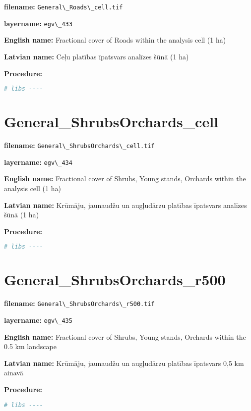 \documentclass[
]{book}
\newcommand{\passthrough}[1]{#1}
\begin{document}
\textbf{filename:} \passthrough{\lstinline!General\_Roads\_cell.tif!}

\textbf{layername:} \passthrough{\lstinline!egv\_433!}

\textbf{English name:} Fractional cover of Roads within the analysis cell (1 ha)

\textbf{Latvian name:} Ceļu platības īpatsvars analīzes šūnā (1 ha)

\textbf{Procedure:}

\begin{lstlisting}[language=R]
# libs ----
\end{lstlisting}

\section{General\_ShrubsOrchards\_cell}\label{ch06.434}

\textbf{filename:} \passthrough{\lstinline!General\_ShrubsOrchards\_cell.tif!}

\textbf{layername:} \passthrough{\lstinline!egv\_434!}

\textbf{English name:} Fractional cover of Shrubs, Young stands, Orchards within the analysis cell (1 ha)

\textbf{Latvian name:} Krūmāju, jaunaudžu un augļudārzu platības īpatsvars analīzes šūnā (1 ha)

\textbf{Procedure:}

\begin{lstlisting}[language=R]
# libs ----
\end{lstlisting}

\section{General\_ShrubsOrchards\_r500}\label{ch06.435}

\textbf{filename:} \passthrough{\lstinline!General\_ShrubsOrchards\_r500.tif!}

\textbf{layername:} \passthrough{\lstinline!egv\_435!}

\textbf{English name:} Fractional cover of Shrubs, Young stands, Orchards within the 0.5 km landscape

\textbf{Latvian name:} Krūmāju, jaunaudžu un augļudārzu platības īpatsvars 0,5 km ainavā

\textbf{Procedure:}

\begin{lstlisting}[language=R]
# libs ----
\end{lstlisting}
\end{document}
